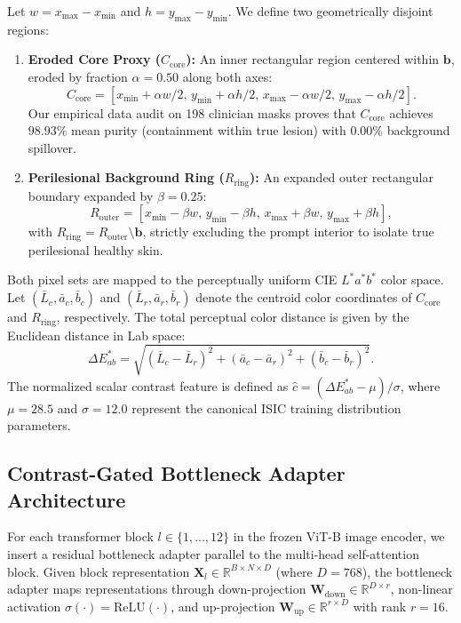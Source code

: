 \documentclass[runningheads]{llncs}
\begin{document}
Let $w = x_{\max} - x_{\min}$ and $h = y_{\max} - y_{\min}$. We define two geometrically disjoint regions:
\begin{enumerate}
    \item \textbf{Eroded Core Proxy ($C_{\text{core}}$):} An inner rectangular region centered within $\mathbf{b}$, eroded by fraction $\alpha = 0.50$ along both axes:
    \begin{equation}
    C_{\text{core}} = [x_{\min} + \alpha w / 2,\, y_{\min} + \alpha h / 2,\, x_{\max} - \alpha w / 2,\, y_{\max} - \alpha h / 2].
    \end{equation}
    Our empirical data audit on 198 clinician masks proves that $C_{\text{core}}$ achieves $98.93\%$ mean purity (containment within true lesion) with $0.00\%$ background spillover.
    \item \textbf{Perilesional Background Ring ($R_{\text{ring}}$):} An expanded outer rectangular boundary expanded by $\beta = 0.25$:
    \begin{equation}
    R_{\text{outer}} = [x_{\min} - \beta w,\, y_{\min} - \beta h,\, x_{\max} + \beta w,\, y_{\max} + \beta h],
    \end{equation}
    with $R_{\text{ring}} = R_{\text{outer}} \setminus \mathbf{b}$, strictly excluding the prompt interior to isolate true perilesional healthy skin.
\end{enumerate}

Both pixel sets are mapped to the perceptually uniform CIE $L^*a^*b^*$ color space. Let $(\bar{L}_c, \bar{a}_c, \bar{b}_c)$ and $(\bar{L}_r, \bar{a}_r, \bar{b}_r)$ denote the centroid color coordinates of $C_{\text{core}}$ and $R_{\text{ring}}$, respectively. The total perceptual color distance is given by the Euclidean distance in Lab space:
\begin{equation}
\Delta E^*_{ab} = \sqrt{(\bar{L}_c - \bar{L}_r)^2 + (\bar{a}_c - \bar{a}_r)^2 + (\bar{b}_c - \bar{b}_r)^2}.
\end{equation}
The normalized scalar contrast feature is defined as $\hat{c} = (\Delta E^*_{ab} - \mu) / \sigma$, where $\mu = 28.5$ and $\sigma = 12.0$ represent the canonical ISIC training distribution parameters.

\subsection{Contrast-Gated Bottleneck Adapter Architecture}
For each transformer block $l \in \{1, \dots, 12\}$ in the frozen ViT-B image encoder, we insert a residual bottleneck adapter parallel to the multi-head self-attention block. Given block representation $\mathbf{X}_l \in \mathbb{R}^{B \times N \times D}$ (where $D=768$), the bottleneck adapter maps representations through down-projection $\mathbf{W}_{\text{down}} \in \mathbb{R}^{D \times r}$, non-linear activation $\sigma(\cdot) = \text{ReLU}(\cdot)$, and up-projection $\mathbf{W}_{\text{up}} \in \mathbb{R}^{r \times D}$ with rank $r=16$.
\end{document}
